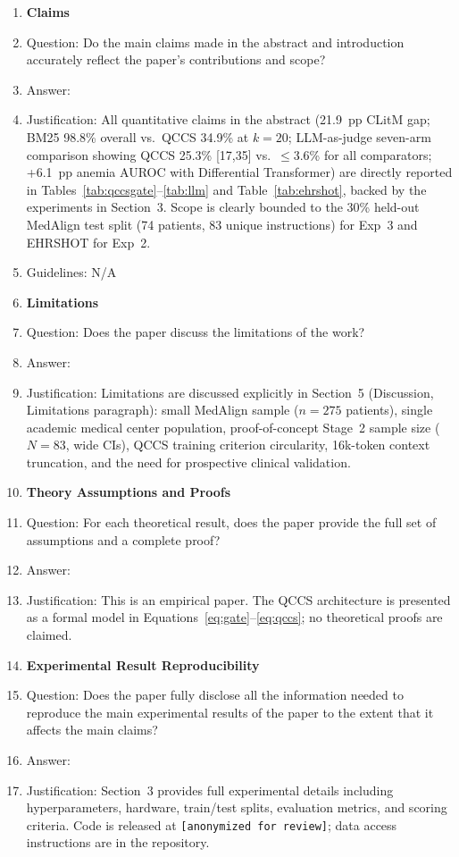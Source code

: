 \documentclass{article}
\begin{document}
\begin{enumerate}

\item {\bf Claims}
  \item[] Question: Do the main claims made in the abstract and introduction
    accurately reflect the paper's contributions and scope?
  \item[] Answer: \answerYes{}
  \item[] Justification: All quantitative claims in the abstract (21.9~pp CLitM
    gap; BM25 98.8\% overall vs.\ QCCS 34.9\% at $k{=}20$; LLM-as-judge
    seven-arm comparison showing QCCS 25.3\% [17,35] vs.\ $\leq$3.6\% for all
    comparators; +6.1~pp anemia AUROC with Differential Transformer) are
    directly reported in Tables~\ref{tab:qccsgate}--\ref{tab:llm} and
    Table~\ref{tab:ehrshot}, backed by the experiments in Section~3. Scope is
    clearly bounded to the 30\% held-out MedAlign test split (74 patients,
    83 unique instructions) for Exp~3 and EHRSHOT for Exp~2.
  \item[] Guidelines: N/A

\item {\bf Limitations}
  \item[] Question: Does the paper discuss the limitations of the work?
  \item[] Answer: \answerYes{}
  \item[] Justification: Limitations are discussed explicitly in
    Section~5 (Discussion, Limitations paragraph): small MedAlign sample
    ($n{=}275$ patients), single academic medical center population, proof-of-concept
    Stage~2 sample size ($N{=}83$, wide CIs), QCCS training criterion circularity,
    16k-token context truncation, and the need for prospective clinical validation.

\item {\bf Theory Assumptions and Proofs}
  \item[] Question: For each theoretical result, does the paper provide the
    full set of assumptions and a complete proof?
  \item[] Answer: \answerNA{}
  \item[] Justification: This is an empirical paper. The QCCS architecture is
    presented as a formal model in Equations~\ref{eq:gate}--\ref{eq:qccs};
    no theoretical proofs are claimed.

\item {\bf Experimental Result Reproducibility}
  \item[] Question: Does the paper fully disclose all the information needed
    to reproduce the main experimental results of the paper to the extent that
    it affects the main claims?
  \item[] Answer: \answerYes{}
  \item[] Justification: Section~3 provides full experimental details including
    hyperparameters, hardware, train/test splits, evaluation metrics, and scoring
    criteria. Code is released at
    \texttt{[anonymized for review]}; data access
    instructions are in the repository.


\end{enumerate}
\end{document}
